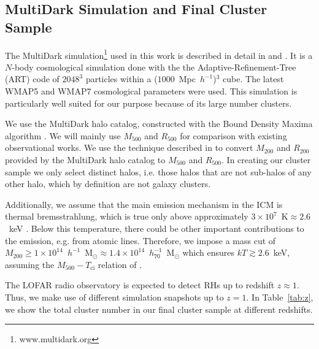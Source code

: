 \documentclass[traditabstract]{aa}
\newcommand{\rmn}{\mathrm}
\begin{document}
\subsection{MultiDark Simulation and Final Cluster Sample}
\label{sec:2.1}
The MultiDark simulation\footnote[3]{www.multidark.org} used in this work is
described in detail in \cite{2011arXiv1104.5130P} and
\cite{2011arXiv1109.0003R}.  It is a $N$-body cosmological simulation done with
the the Adaptive-Refinement-Tree (ART) code \citep{1997ApJS..111...73K} of
$2048^3$ particles within a ($1000$~Mpc~$h^{-1}$)$^3$ cube. The latest WMAP5 and
WMAP7 cosmological parameters were used. This simulation is particularly well
suited for our purpose because of its large number clusters.
 
We use the MultiDark halo catalog, constructed with the Bound Density Maxima
algorithm \citep{1997astro.ph.12217K}.  We will mainly use $M_{500}$ and
$R_{500}$ for comparison with existing observational works.  We use the
technique described in \cite{2003ApJ...584..702H} to convert $M_{200}$ and
$R_{200}$ provided by the MultiDark halo catalog to $M_{500}$ and $R_{500}$.  In
creating our cluster sample we only select distinct halos, i.e. those halos that
are not sub-halos of any other halo, which by definition are not galaxy clusters.

Additionally, we assume that the main emission mechanism in the ICM is thermal
bremsstrahlung, which is true only above approximately
$3\times10^{7}$~$\rmn{K}\approx2.6$~keV \citep{1988xrec.book.....S}. Below this
temperature, there could be other important contributions to the emission,
e.g. from atomic lines. Therefore, we impose a mass cut of
$M_{200}\geq1\times10^{14}$~$h^{-1}$~M$_{\odot}\approx1.4\times10^{14}$~$h_{70}^{-1}$~M$_{\odot}$
which ensures $kT \gtrsim 2.6$~keV, assuming the $M_{500} - T_{\rmn{ci}}$ relation
of \cite{2010MNRAS.406.1773M}.

The LOFAR radio observatory is expected to detect RHs up to redshift $z \approx
1$. Thus, we make use of different simulation snapshots up to $z=1$. In
Table~\ref{tab:z}, we show the total cluster number in our final cluster sample
at different redshifts.
\end{document}
